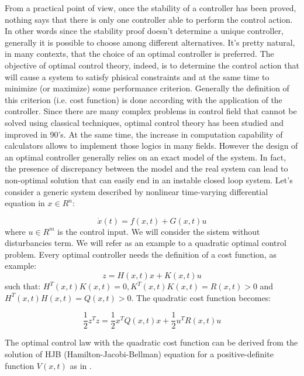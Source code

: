 From a practical point of view, once the stability of a controller has been proved, nothing says that there is only one controller able to perform the control action. In other words since the stability proof doesn't determine a unique controller, generally it is possible to choose among different alternatives. It's pretty natural, in many contexts, that the choice of an optimal controller is preferred. The objective of optimal control theory, indeed, is to determine the control action that will cause a system to satisfy phisical constraints and at the same time to minimize (or maximize) some performance criterion. Generally the definition of this criterion (i.e. cost function) is done according with the application of the controller. Since there are many complex problems in control field that cannot be solved using classical techniques, optimal control theory has been studied and improved in 90's. At the same time, the increase in computation capability of calculators allows to implement those logics in many fields. However the design of an optimal controller generally relies on an exact model of the system. In fact, the presence of discrepancy between the model and the real system can lead to non-optimal solution that can easily end in an instable closed loop system. 
Let's consider a generic system described by nonlinear time-varying differential equation in $x\in R^n$:

\begin{equation}
	\dot{x}(t)=f(x,t)+G(x,t)u
\end{equation}
where $u \in R^m$ is the control input. We will consider the sistem without disturbancies term.
We will refer as an example to a quadratic optimal control problem. 
Every optimal controller needs the definition of a cost function, as example: 
\begin{equation}
	z=H(x,t)x+K(x,t)u
\end{equation}
such that: $H^T(x,t)K(x,t)=0, K^T(x,t)K(x,t)=R(x,t)>0$ and \\ $H^T(x,t)H(x,t)=Q(x,t)>0$. The quadratic cost function becomes:

\begin{equation*}
	\frac{1}{2}z^Tz=\frac{1}{2}x^TQ(x,t)x+\frac{1}{2}u^TR(x,t)u
\end{equation*}

The optimal control law with the quadratic cost function can be derived from  the solution of HJB (Hamilton-Jacobi-Bellman) equation for a positive-definite function $V(x,t)$ as in \cite{kirk1970optimal}.

